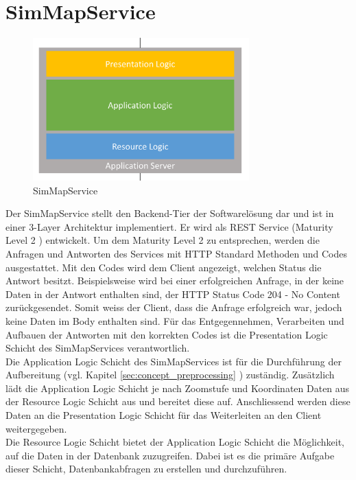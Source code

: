 \section{SimMapService}
\begin{figure}[H]
\centering
\includegraphics[height=5.5cm]{images/BusinessLogicLayer.png}
\caption{SimMapService}
\label{fig:businesslogiclayer}
\end{figure}
\noindent
Der SimMapService stellt den Backend-Tier der Softwarelösung dar und ist in einer 3-Layer Architektur implementiert. Er wird als REST Service (Maturity Level 2 \cite{RESTMaturity}) entwickelt. Um dem Maturity Level 2 zu entsprechen, werden die Anfragen und Antworten des Services mit HTTP Standard Methoden und Codes ausgestattet. Mit den Codes wird dem Client angezeigt, welchen Status die Antwort besitzt. Beispielsweise wird bei einer erfolgreichen Anfrage, in der keine Daten in der Antwort enthalten sind, der HTTP Status Code \glqq{}204 - No Content\grqq{} zurückgesendet. Somit weiss der Client, dass die Anfrage erfolgreich war, jedoch keine Daten im Body enthalten sind. Für das Entgegennehmen, Verarbeiten und Aufbauen der Antworten mit den korrekten Codes ist die Presentation Logic Schicht des SimMapServices verantwortlich.\\
Die Application Logic Schicht des SimMapServices ist für die Durchführung der  Aufbereitung (vgl. Kapitel \ref{sec:concept_preprocessing} ) zuständig. Zusätzlich lädt die Application Logic Schicht je nach Zoomstufe und Koordinaten Daten aus der Resource Logic Schicht aus und bereitet diese auf. Anschliessend werden diese Daten an die Presentation Logic Schicht für das Weiterleiten an den Client weitergegeben.\\
Die Resource Logic Schicht bietet der Application Logic Schicht die Möglichkeit, auf die Daten in der Datenbank zuzugreifen. Dabei ist es die primäre Aufgabe dieser Schicht, Datenbankabfragen zu erstellen und durchzuführen.
